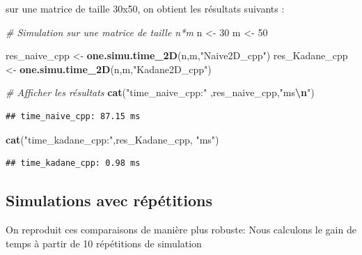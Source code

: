\documentclass[
]{article}
\newenvironment{Shaded}{\begin{snugshade}}{\end{snugshade}}
\newcommand{\CommentTok}[1]{\textcolor[rgb]{0.56,0.35,0.01}{\textit{#1}}}
\newcommand{\DecValTok}[1]{\textcolor[rgb]{0.00,0.00,0.81}{#1}}
\newcommand{\FunctionTok}[1]{\textcolor[rgb]{0.13,0.29,0.53}{\textbf{#1}}}
\newcommand{\NormalTok}[1]{#1}
\newcommand{\OtherTok}[1]{\textcolor[rgb]{0.56,0.35,0.01}{#1}}
\newcommand{\SpecialCharTok}[1]{\textcolor[rgb]{0.81,0.36,0.00}{\textbf{#1}}}
\newcommand{\StringTok}[1]{\textcolor[rgb]{0.31,0.60,0.02}{#1}}
\begin{document}
sur une matrice de taille 30x50, on obtient les résultats suivants :

\begin{Shaded}
\begin{Highlighting}[]
\CommentTok{\# Simulation sur une matrice de taille n*m}
\NormalTok{n }\OtherTok{\textless{}{-}} \DecValTok{30}
\NormalTok{m }\OtherTok{\textless{}{-}} \DecValTok{50}

\NormalTok{res\_naive\_cpp }\OtherTok{\textless{}{-}} \FunctionTok{one.simu.time\_2D}\NormalTok{(n,m,}\StringTok{"Naive2D\_cpp"}\NormalTok{)}
\NormalTok{res\_Kadane\_cpp }\OtherTok{\textless{}{-}} \FunctionTok{one.simu.time\_2D}\NormalTok{(n,m,}\StringTok{"Kadane2D\_cpp"}\NormalTok{)}

\CommentTok{\# Afficher les résultats}
\FunctionTok{cat}\NormalTok{(}\StringTok{"time\_naive\_cpp:"}\NormalTok{ ,res\_naive\_cpp,}\StringTok{"ms}\SpecialCharTok{\textbackslash{}n}\StringTok{"}\NormalTok{)}
\end{Highlighting}
\end{Shaded}

\begin{verbatim}
## time_naive_cpp: 87.15 ms
\end{verbatim}

\begin{Shaded}
\begin{Highlighting}[]
\FunctionTok{cat}\NormalTok{(}\StringTok{"time\_kadane\_cpp:"}\NormalTok{,res\_Kadane\_cpp, }\StringTok{"ms"}\NormalTok{)}
\end{Highlighting}
\end{Shaded}

\begin{verbatim}
## time_kadane_cpp: 0.98 ms
\end{verbatim}

\subsection{Simulations avec
répétitions}\label{simulations-avec-ruxe9puxe9titions}

On reproduit ces comparaisons de manière plus robuste: Nous calculons le
gain de temps à partir de 10 répétitions de simulation
\end{document}
